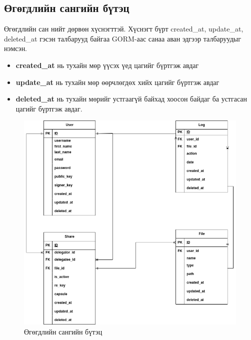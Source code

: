 \subsection*{Өгөгдлийн сангийн бүтэц}
Өгөгдлийн сан нийт дөрвөн хүснэгттэй. Хүснэгт бүрт created\_at, update\_at, deleted\_at гэсэн талбарууд байгаа GORM-аас санаа аван эдгээр талбаруудыг нэмсэн. 

\begin{itemize}
    \item \textbf{created\_at} нь тухайн мөр үүсэх үед цагийг бүртгэж авдаг
    \item \textbf{update\_at} нь тухайн мөр өөрчлөгдөх хийх цагийг бүртгэж авдаг
    \item \textbf{deleted\_at} нь тухайн мөрийг устгаагүй байхад хоосон байдаг ба устгасан цагийг бүртгэж авдаг.
\end{itemize}

\begin{figure}[H]
    \centering
    \includegraphics[scale=0.5]{Figures/database.drawio.png}
    \caption[pyUmbral]{Өгөгдлийн сангийн бүтэц}
    \label{fig:database}
\end{figure}

